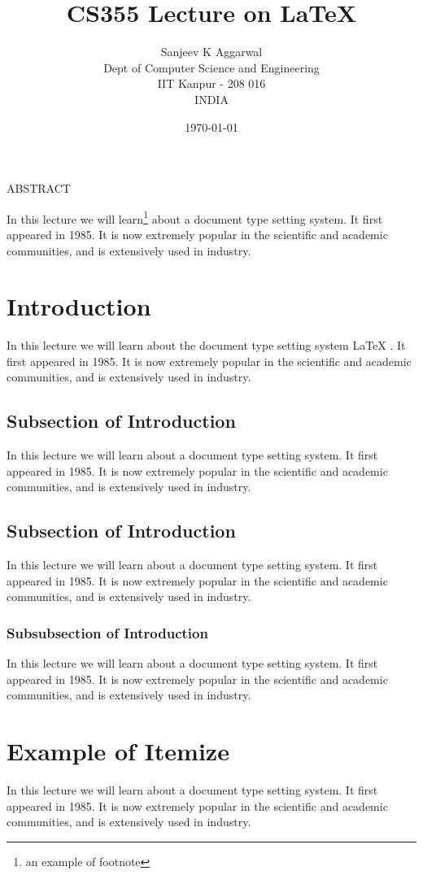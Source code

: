 \documentclass{article}
\title{CS355 Lecture on \LaTeX}
\author{Sanjeev K Aggarwal\\Dept of Computer Science and Engineering\\IIT
Kanpur - 208 016\\INDIA}
\date{\today}
\begin{document}
\maketitle

\tableofcontents

\newpage

\begin{center}{ABSTRACT}
\end{center}

In this lecture we will learn\footnote{an example of footnote}
 about a document type setting system. It first
appeared in 1985. It is now extremely popular in the scientific and academic
communities, and is extensively used in industry.

\section{Introduction}
In this lecture we will learn about the document type setting system \LaTeX
\cite{mainref, suppref}. It first
appeared in 1985. It is now extremely popular in the scientific and academic
communities, and is extensively used in industry.

\subsection{Subsection of Introduction}
In this lecture we will learn about a document type setting system. It first
appeared in 1985. It is now extremely popular in the scientific and academic
communities, and is extensively used in industry.

\subsection{Subsection of Introduction}
In this lecture we will learn about a document type setting system. It first
appeared in 1985. It is now extremely popular in the scientific and academic
communities, and is extensively used in industry.

\subsubsection{Subsubsection of Introduction}
In this lecture we will learn about a document type setting system. It first
appeared in 1985. It is now extremely popular in the scientific and academic
communities, and is extensively used in industry.


\section{Example of Itemize}
In this lecture we will learn about a document type setting system. It first
appeared in 1985. It is now extremely popular in the scientific and academic
communities, and is extensively used in industry.
\end{document}
